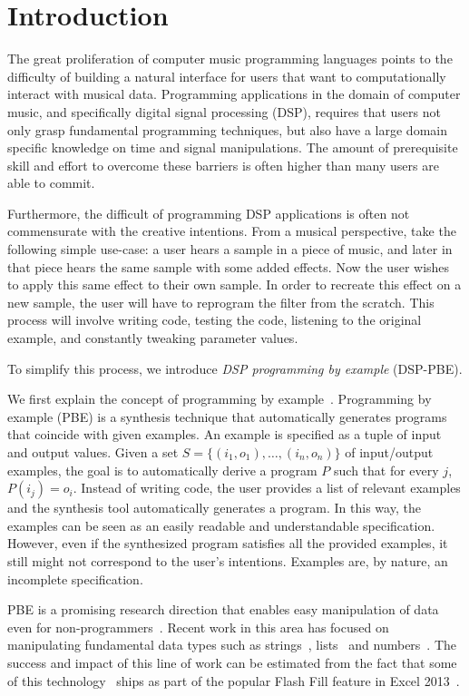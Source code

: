 \section{Introduction}

The great proliferation of computer music programming languages points to the difficulty of building a natural interface for users that want to computationally interact with musical data.
Programming applications in the domain of computer music, and specifically digital signal processing (DSP), requires that users not only grasp fundamental programming techniques, but also have a large domain specific knowledge on time and signal manipulations.
The amount of prerequisite skill and effort to overcome these barriers is often higher than many users are able to commit.

Furthermore, the difficult of programming DSP applications is often not commensurate with the creative intentions.
From a musical perspective, take the following simple use-case: a user hears a sample in a piece of music, and later in that piece hears the same sample with some added effects.
Now the user wishes to apply this same effect to their own sample.
In order to recreate this effect on a new sample, the user will have to reprogram the filter from the scratch.
This process will involve writing code, testing the code, listening to the original example, and constantly tweaking parameter values.

To simplify this process, we introduce \textit{DSP programming by example} (DSP-PBE).

We first explain the concept of programming by example~\cite{cypher93,lieberman01,synasc12}.
Programming by example (PBE) is a synthesis technique that automatically generates programs that coincide with given examples. An example is specified as a tuple of input and output values. Given a set $S= \{(i_1, o_1),\ldots, (i_n, o_n)\}$ of input/output examples, the goal is to automatically derive a program $P$ such that for every $j$, $P(i_j) = o_i$. 
Instead of writing code, the user provides a list of relevant examples and the synthesis tool automatically generates a program. In this way, the examples can be seen as an easily readable and understandable specification. However, even if the synthesized program satisfies all the provided examples, it still might not correspond to the user's intentions. Examples are, by nature, an incomplete specification.


PBE is a promising research direction that enables easy manipulation of data even for non-programmers~\cite{GulwaniHS12}. Recent work in this area has focused on manipulating fundamental data types such as strings~\cite{flashFillPOPL,vldb12,icml13}, lists~\cite{FeserCD15,poseraZ15} and numbers~\cite{cav12}. The success and impact of this line of work can be estimated from the fact that some of this technology~\cite{flashFillPOPL} ships as part of the popular Flash Fill feature in Excel 2013~\cite{flashfill}.


